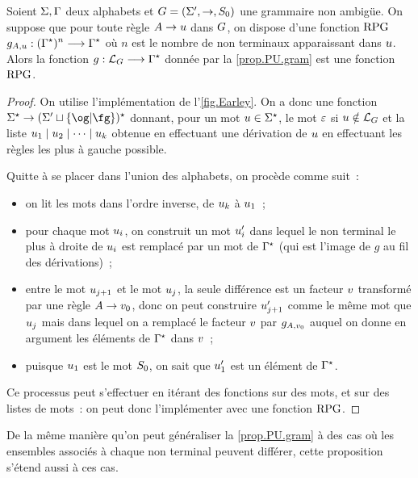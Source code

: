 \begin{proposition}\label{prop.PU.RPG}
  Soient $\Sigma,\Gamma$ deux alphabets et $G = (\Sigma',\to,S_{0})$ une
  grammaire non ambigüe. On suppose que pour toute règle
  $A \to u$ dans $G$, on dispose d'une fonction $\operatorname{RPG}$
  $g_{A,u} : \displaystyle (\Gamma^{\star})^n \longrightarrow \Gamma^{\star}$ où $n$ est le nombre de non
  terminaux apparaissant dans $u$. Alors la fonction
  $g : \displaystyle \mathcal L_{G} \longrightarrow \Gamma^{\star}$ donnée par la \cref{prop.PU.gram}
  est une fonction $\operatorname{RPG}$.
\end{proposition}

\begin{proof}
  On utilise l'implémentation de l'\cref{fig.Earley}. On a donc une fonction
  $\toStA \to \toSt{(\ABA' \sqcup \{\ogM\vert\fgM\})}$ donnant, pour un
  mot $u \in \Sigma^{\star}$, le mot $\varepsilon$ si $u \notin \mathcal L_{G}$ et
  la liste $u_1\mid u_2\mid\cdots\mid u_k$ obtenue en effectuant
  une dérivation de $u$ en effectuant les règles les plus à gauche
  possible.

  Quitte à se placer dans l'union des alphabets, on procède comme suit~:
  \begin{itemize}
  \item on lit les mots dans l'ordre inverse, de $u_k$ à $u_1$~;
  \item pour chaque mot $u_i$, on construit un mot $u_i'$ dans
    lequel le non terminal le plus à droite de $u_i$ est remplacé
    par un mot de $\Gamma^{\star}$ (qui est l'image de $g$ au fil des dérivations)~;
  \item entre le mot $u_{j+1}$ et le mot $u_{j}$, la seule différence
    est un facteur $v$ transformé par une règle $A\to v_0$, donc
    on peut construire $u_{j+1}'$ comme le même mot que $u_{j}$ mais
    dans lequel on a remplacé le facteur $v$ par $g_{A,v_0}$ auquel
    on donne en argument les éléments de $\Gamma^{\star}$ dans $v$~;
  \item puisque $u_1$ est le mot $S_{0}$, on sait que $u_1'$ est un
    élément de $\Gamma^{\star}$.
  \end{itemize}
  Ce processus peut s'effectuer en itérant des fonctions sur des mots, et sur
  des listes de mots~: on peut donc l'implémenter avec une fonction $\operatorname{RPG}$.
\end{proof}

\begin{remark}
  De la même manière qu'on peut généraliser la \cref{prop.PU.gram} à des cas
  où les ensembles associés à chaque non terminal peuvent différer, cette
  proposition s'étend aussi à ces cas.
\end{remark}

